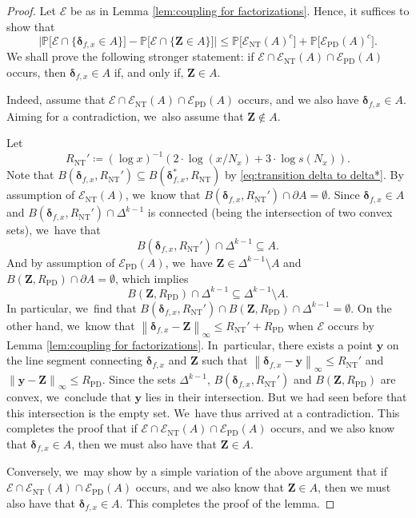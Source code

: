 \documentclass[JEP,XML,SOM,Unicode,published]{cedram}
\newcommand{\bmy}{{\boldsymbol y}}
\newcommand{\bZ}{{\boldsymbol Z}}
\newcommand{\PP}{\mathbb{P}}
\newcommand{\bolddelta}{\boldsymbol{\delta}}
\newcommand{\EC}{\mathcal{E}}
\newcommand{\maxnorm}[1]{\left\| #1 \right\|_{\infty}}
\newcommand{\simplex}{\Delta^{k-1}}
\newcommand{\bg}{\big}
\newcommand{\bgg}{\Big}
\newcommand{\Rnt}{R_{\mathrm{NT}}}
\newcommand{\Rprob}{R_{\mathrm{PD}}}
\newcommand{\ECnt}{\EC_{\mathrm{NT}}}
\newcommand{\ECprob}{\EC_{\mathrm{PD}}}
\theoremstyle{plain}
\theoremstyle{definition}
\begin{document}
\begin{proof} Let $\EC$ be as in Lemma \ref{lem:coupling for factorizations}. Hence, it suffices to show that
\begin{equation}
\label{eq:sym diff D and Z on E}
\bgg| \PP\bg[\EC\cap\{\bolddelta_{f, x} \in A\}\bg] - \PP\bg[\EC\cap\{\bZ \in A\}\bg]\bgg| \le \PP\bg[\ECnt(A)^c\bg] + \PP\bg[\ECprob(A)^c\bg].
\end{equation}
We shall prove the following stronger statement: if $\EC\cap \ECnt(A)\cap \ECprob(A)$ occurs, then $\bolddelta_{f, x}\in A$ if, and only if, $\bZ\in A$.

Indeed, assume that $\EC\cap \ECnt(A)\cap \ECprob(A)$ occurs, and we also have $\bolddelta_{f, x}\in A$. Aiming for a contradiction, we~also assume that $\bZ\notin A$.

Let
\[
\Rnt' \coloneqq (\log x)^{-1}(2\cdot \log(x/N_x) + 3\cdot \log s(N_x)).
\]
Note that $B(\bolddelta_{f, x}, \Rnt') \subseteq B(\bolddelta_{f, x}^*, \Rnt)$ by \eqref{eq:transition delta to delta*}. By assumption of $\ECnt(A)$, we~know that \hbox{$B(\bolddelta_{f, x},\Rnt')\cap\partial A=\emptyset$}. Since $\bolddelta_{f, x} \in A$ and $B(\bolddelta_{f, x},\Rnt')\cap \simplex$ is connected (being the intersection of two convex sets), we~have that
\[
B(\bolddelta_{f, x},\Rnt')\cap \simplex \subseteq A.
\]
And by assumption of $\ECprob(A)$, we~have $\bZ \in \simplex \setminus A$ and $B(\bZ,\Rprob)\cap\partial A=\emptyset$, which implies
\[
B(\bZ,\Rprob)\cap \simplex \subseteq \simplex \setminus A.
\]
In particular, we~find that $B(\bolddelta_{f, x}, \Rnt')\cap B(\bZ,\Rprob)\cap \simplex =\emptyset$. On the other hand, we~know that $\maxnorm{\bolddelta_{f, x}-\bZ}\le \Rnt' +\Rprob$ when $\EC$ occurs by Lemma \ref{lem:coupling for factorizations}. In~particular, there exists a point $\bmy$ on the line segment connecting $\bolddelta_{f, x}$ and $\bZ$ such that $\maxnorm{\bolddelta_{f, x}-\bmy}\le \Rnt'$ and $\maxnorm{\bmy-\bZ}\le \Rprob$. Since the sets $\simplex$, $B(\bolddelta_{f, x},\Rnt')$ and $B(\bZ,\Rprob)$ are convex, we~conclude that $\bmy$ lies in their intersection. But we had seen before that this intersection is the empty set. We~have thus arrived at a contradiction. This completes the proof that if $\EC\cap \ECnt(A)\cap \ECprob(A)$ occurs, and we also know that $\bolddelta_{f, x}\in A$, then we must also have that $\bZ\in A$.

Conversely, we~may show by a simple variation of the above argument that if $\EC\cap \ECnt(A)\cap \ECprob(A)$ occurs, and we also know that $\bZ\in A$, then we must also have that $\bolddelta_{f, x}\in A$. This completes the proof of the lemma.
\end{proof}
\end{document}
